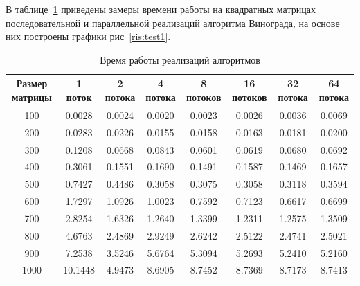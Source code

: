 \documentclass[a4paper,12pt]{article}
\begin{document}
	    В таблице~\ref{tabular:test_time} приведены замеры времени работы на квадратных матрицах последовательной и параллельной реализаций алгоритма Винограда, на основе них построены графики рис~\ref{ris:test1}.
	\begin{table}[H]
	\caption{\label{tabular:test_time} Время работы реализаций алгоритмов}
	\begin{center}	    
	\begin{tabular}{|c|c|c|c|c|c|c|c|}        			
        				\hline
        				Размер матрицы & 1 поток & 2 потока & 4 потока & 8 потоков & 16 потоков & 32 потока & 64 потока \\
        				\hline
        				100      &0.0028  &0.0024  &0.0020  &0.0023 & 0.0026 & 0.0036 & 0.0069\\
        				200      &0.0283  &0.0226  &0.0155 & 0.0158 & 0.0163 & 0.0181 & 0.0200\\
        				300      &0.1208  &0.0668  &0.0843 & 0.0601 & 0.0619 & 0.0680 & 0.0692\\
        				400      &0.3061  &0.1551  &0.1690 & 0.1491 & 0.1587 & 0.1469 & 0.1657\\ 
        				500      &0.7427  &0.4486  &0.3058 & 0.3075 & 0.3058 & 0.3118 & 0.3594\\
        				600      &1.7297  &1.0926  &1.0023 & 0.7592 & 0.7123 & 0.6617 & 0.6699\\ 
        				700      &2.8254  &1.6326  &1.2640 & 1.3399 & 1.2311 & 1.2575 & 1.3509\\
        				800      &4.6763  &2.4869  &2.9249 & 2.6242 & 2.5122 & 2.4741 & 2.5021\\
        				900      &7.2538  &3.5246  &5.6764 & 5.3094 & 5.2693 & 5.2410 & 5.2160\\
        			   1000      &10.1448 &4.9473  &8.6905 & 8.7452 & 8.7369 & 8.7173 & 8.7413\\          						
        				\hline
	\end{tabular}
	\end{center}
	\end{table}
\end{document}

